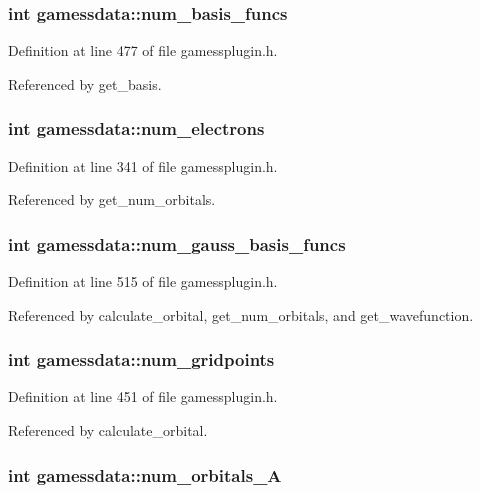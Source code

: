 \subsubsection{\setlength{\rightskip}{0pt plus 5cm}int gamessdata::num\_\-basis\_\-funcs}\label{structgamessdata_m63}




Definition at line 477 of file gamessplugin.h.

Referenced by get\_\-basis.
\subsubsection{\setlength{\rightskip}{0pt plus 5cm}int gamessdata::num\_\-electrons}\label{structgamessdata_m23}




Definition at line 341 of file gamessplugin.h.

Referenced by get\_\-num\_\-orbitals.
\subsubsection{\setlength{\rightskip}{0pt plus 5cm}int gamessdata::num\_\-gauss\_\-basis\_\-funcs}\label{structgamessdata_m72}




Definition at line 515 of file gamessplugin.h.

Referenced by calculate\_\-orbital, get\_\-num\_\-orbitals, and get\_\-wavefunction.
\subsubsection{\setlength{\rightskip}{0pt plus 5cm}int gamessdata::num\_\-gridpoints}\label{structgamessdata_m58}




Definition at line 451 of file gamessplugin.h.

Referenced by calculate\_\-orbital.
\subsubsection{\setlength{\rightskip}{0pt plus 5cm}int gamessdata::num\_\-orbitals\_\-A}\label{structgamessdata_m69}





